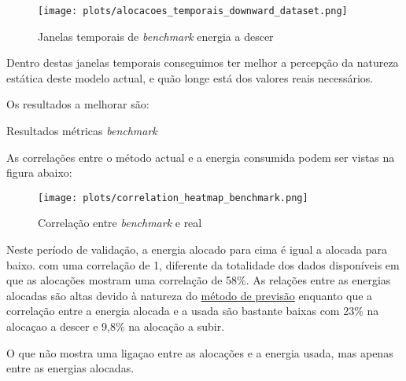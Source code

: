 \begin{figure}[H]
    \centering
    \texttt{[image: plots/alocacoes\_temporais\_downward\_dataset.png]}
    \caption{Janelas temporais de \textit{benchmark} energia a descer}
    \label{fig:benchmarktimewindowsdown}
\end{figure}

Dentro destas janelas temporais conseguimos ter melhor a percepção da natureza estática deste modelo actual, e quão longe está dos valores reais necessários.\par

Os resultados a melhorar são:\\
\begin{table}[H]
    \centering
    \caption{Resultados métricas \textit{benchmark}}    
    \resizebox{0.8\linewidth}{!}{}
    \label{tab:benchmarkmetrics}
    \end{table}

As correlações entre o método actual e a energia consumida podem ser vistas na figura abaixo:\\


\begin{figure}[H]
    \centering
    \texttt{[image: plots/correlation\_heatmap\_benchmark.png]}
    \caption{Correlação entre \textit{benchmark} e real}
    \label{fig:benchmarkcorr}
\end{figure}

Neste período de validação, a energia alocado para cima é igual a alocada para baixo. com uma correlação de 1, diferente da totalidade dos dados disponíveis em que as alocações mostram uma correlação de 58\%.
As relações entre as energias alocadas são altas devido à natureza do \hyperref[]{método de previsão} enquanto que a correlação entre a energia alocada e a usada são bastante baixas com 23\% na alocaçao a descer e 9,8\% na alocação a subir.\par
O que não mostra uma ligaçao entre as alocações e a energia usada, mas apenas entre as energias alocadas.\par

